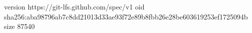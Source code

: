 version https://git-lfs.github.com/spec/v1
oid sha256:aba98796ab7c8dd21013d33ae93f72e89b8fbb26e28be603619253ef1725094b
size 87540
